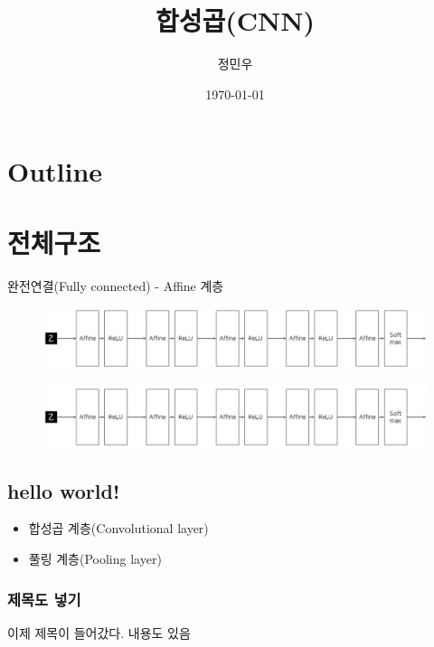 \documentclass{beamer}
\begin{document}
\begin{frame}
	\title{합성곱(CNN)}
	\author{정민우}
	\date{\today}
	\titlepage
\end{frame}



\section*{Outline}
\begin{frame}
\tableofcontents
\end{frame}



\section{전체구조}
\begin{frame}
	완전연결(Fully connected) - Affine 계층
	\begin{figure}
		\includegraphics[width=1\columnwidth]{../Figure/Figure_1.pdf}
	\end{figure}
	\begin{figure}
		\includegraphics[width=1\columnwidth]{../Figure/Figure_1.pdf}
	\end{figure}	
\end{frame}

\subsection{hello world!}

\begin{frame}
	\begin{itemize}
		\item 합성곱 계층(Convolutional layer)
		\item 풀링 계층(Pooling layer)
	\end{itemize}\end{frame}
\begin{frame}
	\frametitle{제목도 넣기}
	이제 제목이 들어갔다.
	내용도 있음
\end{frame}
\end{document}
